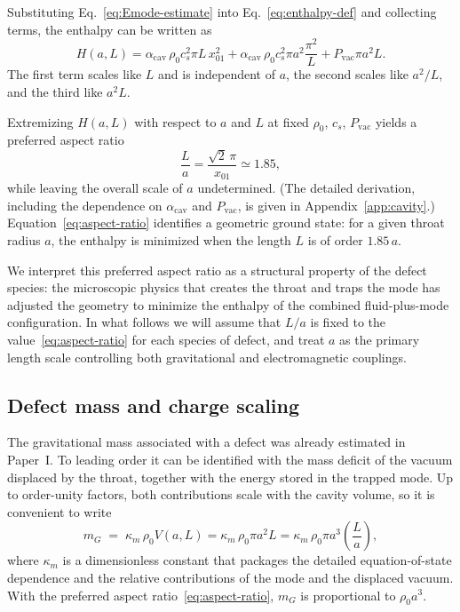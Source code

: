 \documentclass[11pt]{article}
\newcommand{\acav}{\alpha_{\mathrm{cav}}}
\begin{document}
Substituting Eq.~\eqref{eq:Emode-estimate} into Eq.~\eqref{eq:enthalpy-def} and collecting terms, the enthalpy can be written as
\begin{equation}
H(a,L) =
\acav\,\rho_0 c_s^2 \pi L\,x_{01}^2
+ \acav\,\rho_0 c_s^2 \pi a^2 \frac{\pi^2}{L}
+ P_{\mathrm{vac}} \pi a^2 L.
\label{eq:H-structure}
\end{equation}
The first term scales like $L$ and is independent of $a$, the second scales like $a^2/L$, and the third like $a^2 L$.

Extremizing $H(a,L)$ with respect to $a$ and $L$ at fixed $\rho_0$, $c_s$, $P_{\mathrm{vac}}$ yields a preferred aspect ratio
\begin{equation}
\frac{L}{a} = \frac{\sqrt{2}\,\pi}{x_{01}}
\simeq 1.85,
\label{eq:aspect-ratio}
\end{equation}
while leaving the overall scale of $a$ undetermined.  (The detailed derivation, including the dependence on $\acav$ and $P_{\mathrm{vac}}$, is given in Appendix~\ref{app:cavity}.)  Equation~\eqref{eq:aspect-ratio} identifies a geometric ground state: for a given throat radius $a$, the enthalpy is minimized when the length $L$ is of order $1.85\,a$.

We interpret this preferred aspect ratio as a structural property of the defect species: the microscopic physics that creates the throat and traps the mode has adjusted the geometry to minimize the enthalpy of the combined fluid-plus-mode configuration.  In what follows we will assume that $L/a$ is fixed to the value~\eqref{eq:aspect-ratio} for each species of defect, and treat $a$ as the primary length scale controlling both gravitational and electromagnetic couplings.

\subsection{Defect mass and charge scaling}

The gravitational mass associated with a defect was already estimated in Paper~I.  To leading order it can be identified with the mass deficit of the vacuum displaced by the throat, together with the energy stored in the trapped mode.  Up to order-unity factors, both contributions scale with the cavity volume, so it is convenient to write
\begin{equation}
m_G \;=\; \kappa_m\,\rho_0 V(a,L)
= \kappa_m\,\rho_0 \pi a^2 L
= \kappa_m\,\rho_0 \pi a^3 \left(\frac{L}{a}\right),
\label{eq:mG-def}
\end{equation}
where $\kappa_m$ is a dimensionless constant that packages the detailed equation-of-state dependence and the relative contributions of the mode and the displaced vacuum.  With the preferred aspect ratio~\eqref{eq:aspect-ratio}, $m_G$ is proportional to $\rho_0 a^3$.
\end{document}
